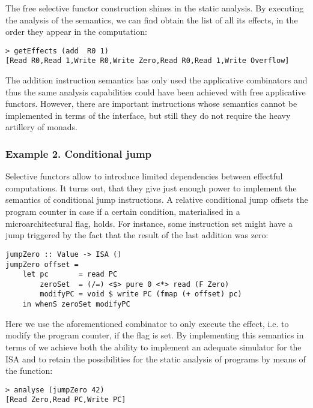 The free selective functor construction shines in the static analysis. By executing
the analysis of the  semantics, we can find obtain the list of all its effects,
in the order they appear in the computation:
\begin{verbatim}
> getEffects (add  R0 1)
[Read R0,Read 1,Write R0,Write Zero,Read R0,Read 1,Write Overflow]
\end{verbatim}

The addition instruction semantics has only used the applicative combinators and thus
the same analysis capabilities could have been achieved with free applicative functors.
However, there are important instructions whose semantics cannot be implemented in terms
of the  interface, but still they do not require the heavy artillery of monads.

\subsubsection{\textbf{Example 2. Conditional jump}}

Selective functors allow to introduce limited dependencies between effectful computations.
It turns out, that they give just enough power to implement the semantics of conditional
jump instructions. A relative conditional jump offsets the program counter in case if a
certain condition, materialised in a microarchitectural flag, holds. For instance, some instruction set might have a jump triggered by the fact that the result of the last addition was zero:

\begin{verbatim}
jumpZero :: Value -> ISA ()
jumpZero offset =
    let pc       = read PC
        zeroSet  = (/=) <$> pure 0 <*> read (F Zero)
        modifyPC = void $ write PC (fmap (+ offset) pc)
    in whenS zeroSet modifyPC
\end{verbatim}

Here we use the aforementioned  combinator to only execute the effect, i.e.
to modify the program counter, if the flag is set. By implementing this semantics in terms of
 we achieve both the ability to implement an adequate simulator for the ISA and
to retain the possibilities for the static analysis of programs by means of the  function:

\begin{verbatim}
> analyse (jumpZero 42)
[Read Zero,Read PC,Write PC]
\end{verbatim}

